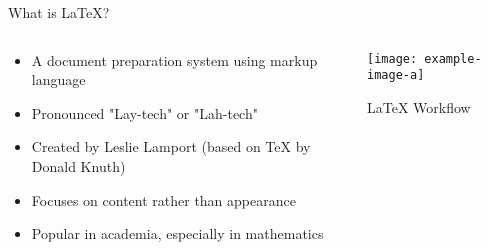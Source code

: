 \documentclass[ 9pt]{beamer}
\begin{document}
    \begin{frame}{What is LaTeX?}
        \begin{columns}
            \begin{column}{0.6\textwidth}
                \begin{itemize}
                    \item A document preparation system using markup language
                    \item Pronounced "Lay-tech" or "Lah-tech"
                    \item Created by Leslie Lamport (based on TeX by Donald Knuth)
                    \item Focuses on \alert{content} rather than \alert{appearance}
                    \item Popular in academia, especially in mathematics
                \end{itemize}
            \end{column}
            
            \begin{column}{0.4\textwidth}
                \texttt{[image: example-image-a]}
                \centerline{LaTeX Workflow}
            \end{column}
        \end{columns}
    \end{frame}
    
\end{document}
